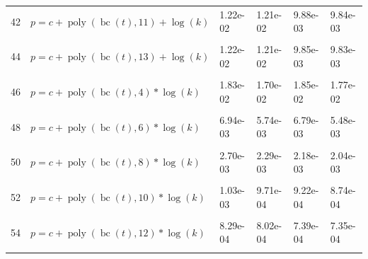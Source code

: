 \documentclass[12pt,a4paper]{article}
\DeclareMathOperator{\bc}{bc}
\DeclareMathOperator{\poly}{poly}
\begin{document}
\begin{longtable}[t]{ll>{\raggedleft\arraybackslash}p{2cm}>{\raggedleft\arraybackslash}p{2cm}>{\raggedleft\arraybackslash}p{2cm}>{\raggedleft\arraybackslash}p{2cm}}
42 & $p = c + \poly\left( \bc(t), 11 \right) + \log(k)$ & 1.22e-02 & 1.21e-02 & 9.88e-03 & 9.84e-03\\
\cellcolor{gray!6}{43} & \cellcolor{gray!6}{$p = c + \poly\left( \bc(t), 12 \right) + \log(k)$} & \cellcolor{gray!6}{1.22e-02} & \cellcolor{gray!6}{1.21e-02} & \cellcolor{gray!6}{9.85e-03} & \cellcolor{gray!6}{9.83e-03}\\
44 & $p = c + \poly\left( \bc(t), 13 \right) + \log(k)$ & 1.22e-02 & 1.21e-02 & 9.85e-03 & 9.83e-03\\
\cellcolor{gray!6}{45} & \cellcolor{gray!6}{$p = c + \poly\left( \bc(t), 3 \right) * \log(k)$} & \cellcolor{gray!6}{2.74e-02} & \cellcolor{gray!6}{1.69e-02} & \cellcolor{gray!6}{1.76e-02} & \cellcolor{gray!6}{1.66e-02}\\
46 & $p = c + \poly\left( \bc(t), 4 \right) * \log(k)$ & 1.83e-02 & 1.70e-02 & 1.85e-02 & 1.77e-02\\
\cellcolor{gray!6}{47} & \cellcolor{gray!6}{$p = c + \poly\left( \bc(t), 5 \right) * \log(k)$} & \cellcolor{gray!6}{1.33e-02} & \cellcolor{gray!6}{1.31e-02} & \cellcolor{gray!6}{1.05e-02} & \cellcolor{gray!6}{1.05e-02}\\
48 & $p = c + \poly\left( \bc(t), 6 \right) * \log(k)$ & 6.94e-03 & 5.74e-03 & 6.79e-03 & 5.48e-03\\
\cellcolor{gray!6}{49} & \cellcolor{gray!6}{$p = c + \poly\left( \bc(t), 7 \right) * \log(k)$} & \cellcolor{gray!6}{5.18e-03} & \cellcolor{gray!6}{3.91e-03} & \cellcolor{gray!6}{3.90e-03} & \cellcolor{gray!6}{3.47e-03}\\
50 & $p = c + \poly\left( \bc(t), 8 \right) * \log(k)$ & 2.70e-03 & 2.29e-03 & 2.18e-03 & 2.04e-03\\
\cellcolor{gray!6}{51} & \cellcolor{gray!6}{$p = c + \poly\left( \bc(t), 9 \right) * \log(k)$} & \cellcolor{gray!6}{2.40e-03} & \cellcolor{gray!6}{2.08e-03} & \cellcolor{gray!6}{2.08e-03} & \cellcolor{gray!6}{1.90e-03}\\
52 & $p = c + \poly\left( \bc(t), 10 \right) * \log(k)$ & 1.03e-03 & 9.71e-04 & 9.22e-04 & 8.74e-04\\
\cellcolor{gray!6}{53} & \cellcolor{gray!6}{$p = c + \poly\left( \bc(t), 11 \right) * \log(k)$} & \cellcolor{gray!6}{1.03e-03} & \cellcolor{gray!6}{9.68e-04} & \cellcolor{gray!6}{9.34e-04} & \cellcolor{gray!6}{8.82e-04}\\
54 & $p = c + \poly\left( \bc(t), 12 \right) * \log(k)$ & 8.29e-04 & 8.02e-04 & 7.39e-04 & 7.35e-04\\
\cellcolor{gray!6}{55} & \cellcolor{gray!6}{$p = c + \poly\left( \bc(t), 13 \right) * \log(k)$} & \cellcolor{gray!6}{7.71e-04} & \cellcolor{gray!6}{7.63e-04} & \cellcolor{gray!6}{7.37e-04} & \cellcolor{gray!6}{7.31e-04}\\

\end{longtable}
\end{document}

